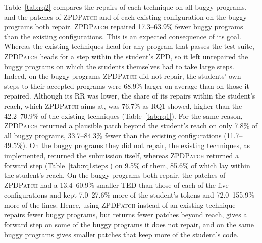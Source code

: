 \documentclass[conference]{IEEEtran}
\begin{document}
Table~\ref{tab:rq2} compares the repairs of each technique on all buggy programs, and the patches of \textsc{ZPDPatch} and of each existing configuration on the buggy programs both repair. \textsc{ZPDPatch} repaired 17.3--63.9\% fewer buggy programs than the existing configurations. This is an expected consequence of its goal. Whereas the existing techniques head for any program that passes the test suite, \textsc{ZPDPatch} heads for a step within the student's ZPD, so it left unrepaired the buggy programs on which the students themselves had to take large steps. Indeed, on the buggy programs \textsc{ZPDPatch} did not repair, the students' own steps to their accepted programs were 68.9\% larger on average than on those it repaired. Although its RR was lower, the share of its repairs within the student's reach, which \textsc{ZPDPatch} aims at, was 76.7\% as RQ1 showed, higher than the 42.2--70.9\% of the existing techniques (Table~\ref{tab:rq1}). For the same reason, \textsc{ZPDPatch} returned a plausible patch beyond the student's reach on only 7.8\% of all buggy programs, 33.7--84.3\% fewer than the existing configurations (11.7--49.5\%). On the buggy programs they did not repair, the existing techniques, as implemented, returned the submission itself, whereas \textsc{ZPDPatch} returned a forward step (Table~\ref{tab:rq1steps}) on 9.5\% of them, 85.6\% of which lay within the student's reach. On the buggy programs both repair, the patches of \textsc{ZPDPatch} had a 13.4--60.9\% smaller TED than those of each of the five configurations and kept 7.0--27.6\% more of the student's tokens and 72.0--155.9\% more of the lines. Hence, using \textsc{ZPDPatch} instead of an existing technique repairs fewer buggy programs, but returns fewer patches beyond reach, gives a forward step on some of the buggy programs it does not repair, and on the same buggy programs gives smaller patches that keep more of the student's code.
\end{document}
